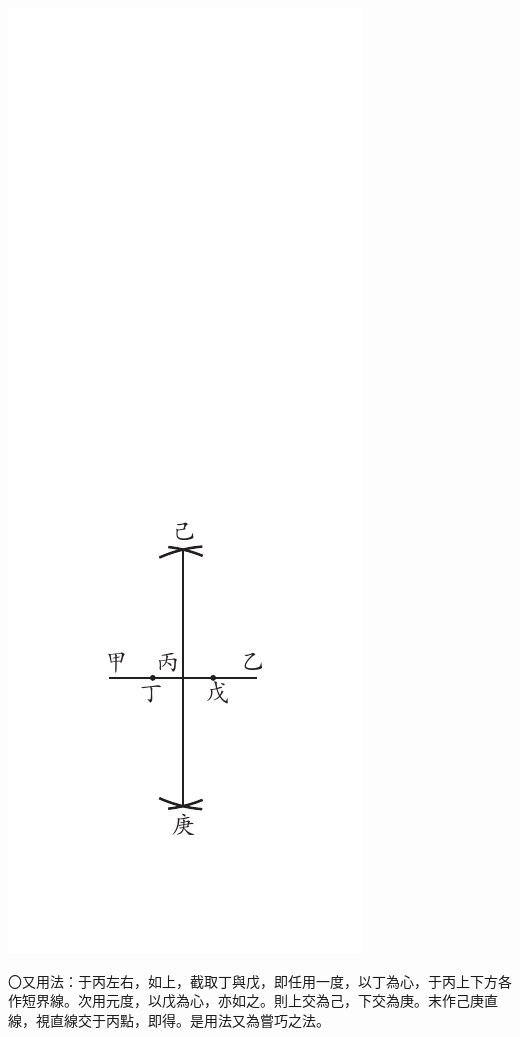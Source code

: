 \documentclass[12pt,b5paper,landscape]{article}
\newcommand{\bcom}[1]{〇#1}
\begin{document}
\begin{multicols}{2}
\begin{center}
\includegraphics[angle=90]{eu52}
\end{center}
\bcom{又用法：于丙左右，如上，截取丁與戊，即任用一度，以丁為心，于丙上下方各作短界線。次用元度，以戊為心，亦如之。則上交為己，下交為庚。末作己庚直線，視直線交于丙點，即得。是用法又為嘗巧之法。}
\begin{center}

\end{center}
\end{multicols}
\end{document}
